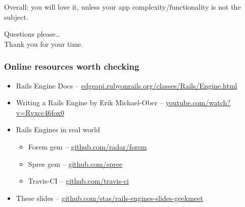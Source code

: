\documentclass[compress]{beamer}
\begin{document}
\begin{frame}
  \begin{center}
    \huge Overall: you will love it, unless your app complexity/functionality is not the subject.
  \end{center}
\end{frame}

\begin{frame}
  \begin{center}
  \huge Questions please\ldots
  \\
  Thank you for your time.
  \end{center}
\end{frame}

\begin{frame}
\frametitle{Online resources worth checking}

\begin{itemize}
  \item Rails Engine Docs -- \href{http://edgeapi.rubyonrails.org/classes/Rails/Engine.html}{edgeapi.rubyonrails.org/classes/Rails/Engine.html}
  \item Writing a Rails Engine by Erik Michael-Ober -- \href{http://www.youtube.com/watch?v=Rvxcc46fox0}{youtube.com/watch?v=Rvxcc46fox0}
  \item Rails Engines in real world
    \begin{itemize}
      \item Forem gem -- \href{https://github.com/radar/forem}{github.com/radar/forem}
      \item Spree gem -- \href{https://github.com/spree}{github.com/spree}
      \item Travis-CI -- \href{https://github.com/travis-ci}{github.com/travis-ci}
    \end{itemize}
  \item These slides -- \href{https://github.com/stas/rails-engines-slides-geekmeet}{github.com/stas/rails-engines-slides-geekmeet}
\end{itemize}

\end{frame}
\end{document}
